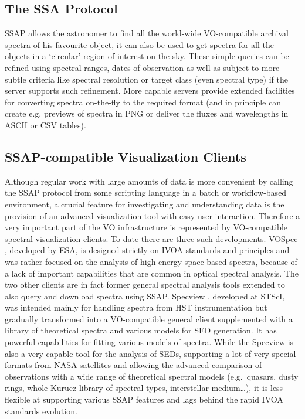 \documentclass[final,authoryear,5p,times,twocolumn]{elsarticle}
\begin{document}
\subsection{The SSA Protocol}
%
SSAP allows the astronomer to find all the world-wide VO-compatible archival
spectra of his favourite object, it can also be used to get spectra for all
the objects in a `circular' region of interest on the sky. These simple
queries can be refined using spectral ranges, dates of observation as well as
subject to more subtle criteria like spectral resolution or target class (even
spectral type) if the server supports such refinement. More capable servers
provide extended facilities for converting spectra on-the-fly to the required
format (and in principle can create e.g. previews of spectra in PNG or deliver
the fluxes and wavelengths in ASCII or CSV tables).

\subsection{SSAP-compatible  Visualization Clients}
%
Although regular work with large amounts of data is more convenient by calling
the SSAP protocol from some scripting language in a batch or workflow-based
environment, a crucial feature for investigating and understanding data is the
provision of an advanced visualization tool with easy user interaction.
Therefore a very important part of the VO infrastructure is represented by
VO-compatible spectral visualization clients. To date there are three such
developments. VOSpec \citep[][]{2005ASPC..347..198O}, developed
by ESA, is designed strictly on IVOA standards and principles and was rather
focused on the analysis of high energy space-based spectra, because of a lack
of important capabilities that are common in optical spectral analysis. The
two other clients are in fact former general spectral analysis tools extended
to also query and download spectra using SSAP.
Specview \citep[][]{2002SPIE.4847..410B}, developed at STScI,
was intended mainly for handling spectra from HST instrumentation but gradually
transformed into a VO-compatible general client supplemented with a library of
theoretical spectra and various models for SED generation. It has powerful
capabilities for fitting various models of spectra.
While the Specview is also a very capable tool for the analysis of SEDs,
supporting a lot of very special formats from NASA satellites and allowing the
advanced comparison of observations with a wide range of theoretical spectral
models (e.g.\ quasars, dusty rings, whole Kurucz library of spectral types,
interstellar medium\ldots), it is less flexible at supporting various SSAP
features and lags behind the rapid IVOA standards evolution.
\end{document}
